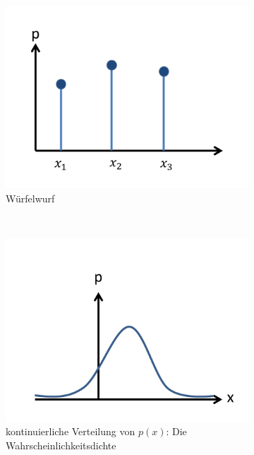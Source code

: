 \documentclass[12pt]{article}
\begin{document}
\begin{figure}[h]
		\begin{subfigure}[h]{0.5 \textwidth}
		\centering
		\includegraphics[width=\textwidth]{Folie7.png}
		\caption{Würfelwurf} 
		\label{fig:Wuerfelwurf}
		\centering
	\end{subfigure}
	~
	\begin{subfigure}[h]{0.5\textwidth}
		\centering
		\includegraphics[width=\textwidth]{Folie8.png}
		\caption{kontinuierliche Verteilung von $p(x)$: Die Wahrscheinlichkeitsdichte} 
		\label{fig:wahrscheinlichkeitsdichte}
		\centering
	\end{subfigure}
	\caption{ }
\end{figure}
\end{document}
